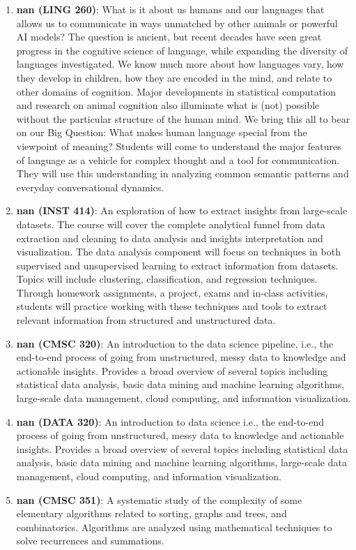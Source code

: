 \begin{enumerate}
\item \textbf{nan (LING 260)}: What is it about us humans and our languages that allows us to communicate in ways unmatched by other animals or powerful AI models? The question is ancient, but recent decades have seen great progress in the cognitive science of language, while expanding the diversity of languages investigated. We know much more about how languages vary, how they develop in children, how they are encoded in the mind, and relate to other domains of cognition. Major developments in statistical computation and research on animal cognition also illuminate what is (not) possible without the particular structure of the human mind. We bring this all to bear on our Big Question: What makes human language special from the viewpoint of meaning? Students will come to understand the major features of language as a vehicle for complex thought and a tool for communication. They will use this understanding in analyzing common semantic patterns and everyday conversational dynamics.
\item \textbf{nan (INST 414)}: An exploration of how to extract insights from large-scale datasets. The course will cover the complete analytical funnel from data extraction and cleaning to data analysis and insights interpretation and visualization. The data analysis component will focus on techniques in both supervised and unsupervised learning to extract information from datasets. Topics will include clustering, classification, and regression techniques. Through homework assignments, a project, exams and in-class activities, students will practice working with these techniques and tools to extract relevant information from structured and unstructured data.
\item \textbf{nan (CMSC 320)}: An introduction to the data science pipeline, i.e., the end-to-end process of going from unstructured, messy data to knowledge and actionable insights. Provides a broad overview of several topics including statistical data analysis, basic data mining and machine learning algorithms, large-scale data management, cloud computing, and information visualization.
\item \textbf{nan (DATA 320)}: An introduction to data science i.e., the end-to-end process of going from unstructured, messy data to knowledge and actionable insights. Provides a broad overview of several topics including statistical data analysis, basic data mining and machine learning algorithms, large-scale data management, cloud computing, and information visualization.
\item \textbf{nan (CMSC 351)}: A systematic study of the complexity of some elementary algorithms related to sorting, graphs and trees, and combinatorics. Algorithms are analyzed using mathematical techniques to solve recurrences and summations.

\end{enumerate}
